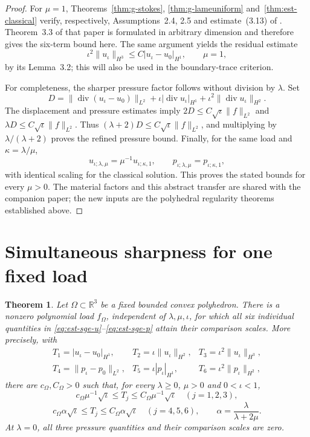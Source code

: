 \documentclass[11pt,a4paper]{article}
\newtheorem{theorem}{Theorem}[section]
\theoremstyle{remark}
\numberwithin{equation}{section}
\begin{document}
\begin{proof}
For \(\mu=1\), Theorems~\ref{thm:g-stokes},
\ref{thm:g-lameuniform} and~\ref{thm:est-classical} verify, respectively,
Assumptions~2.4, 2.5 and estimate~(3.13) of
\cite{PolygonCompanion2026}. Theorem~3.3 of that paper is formulated
in arbitrary dimension and therefore gives the six-term bound here.
The same argument yields the residual estimate
\begin{equation}\label{eq:est-sge-third}
 \iota^2\|u_\iota\|_{H^3}\le C|u_\iota-u_0|_{H^1},\qquad \mu=1,
\end{equation}
by its Lemma~3.2; this will also be used in the boundary-trace criterion.

For completeness, the sharper pressure factor follows without division
by \(\lambda\). Set
\[
 D=\|\operatorname{div}(u_\iota-u_0)\|_{L^2}
 +\iota|\operatorname{div}u_\iota|_{H^1}
 +\iota^2\|\operatorname{div}u_\iota\|_{H^2}.
\]
The displacement and pressure estimates imply
\(2D\le C\sqrt\iota\|f\|_{L^2}\) and
\(\lambda D\le C\sqrt\iota\|f\|_{L^2}\).
Thus \((\lambda+2)D\le C\sqrt\iota\|f\|_{L^2}\), and multiplying
by \(\lambda/(\lambda+2)\) proves the refined pressure bound.
Finally, for the same load and \(\kappa=\lambda/\mu\),
\[
 u_{\iota;\lambda,\mu}=\mu^{-1}u_{\iota;\kappa,1},\qquad
 p_{\iota;\lambda,\mu}=p_{\iota;\kappa,1},
\]
with identical scaling for the classical solution. This proves the
stated bounds for every \(\mu>0\). The material factors and this
abstract transfer are shared with the companion paper; the new inputs
are the polyhedral regularity theorems established above.
\end{proof}

\section{Simultaneous sharpness for one fixed load}
\label{sec:est-sharpness}

\begin{theorem}\label{thm:est-sharpness}
Let $\Omega\subset\mathbb R^3$ be a fixed bounded convex polyhedron.
There is a nonzero polynomial load $f_\Omega$, independent of
$\lambda,\mu,\iota$, for which all six individual quantities in
\eqref{eq:est-sge-u}--\eqref{eq:est-sge-p} attain their comparison scales. More precisely, with
\[
\begin{array}{lll}
 T_1=|u_\iota-u_0|_{H^1},&T_2=\iota\|u_\iota\|_{H^2},
       &T_3=\iota^2\|u_\iota\|_{H^3},\\
 T_4=\|p_\iota-p_0\|_{L^2},&T_5=\iota|p_\iota|_{H^1},
       &T_6=\iota^2\|p_\iota\|_{H^2},
\end{array}
\]
there are $c_\Omega,C_\Omega>0$ such that, for every
$\lambda\ge0$, $\mu>0$ and $0<\iota<1$,
\[
 c_\Omega\mu^{-1}\sqrt\iota\le T_j
       \le C_\Omega\mu^{-1}\sqrt\iota\quad(j=1,2,3),
\]
\[
 c_\Omega\alpha\sqrt\iota\le T_j
       \le C_\Omega\alpha\sqrt\iota\quad(j=4,5,6),
 \qquad \alpha=\frac{\lambda}{\lambda+2\mu}.
\]
At $\lambda=0$, all three pressure quantities and their comparison
scales are zero.
\end{theorem}
\end{document}
